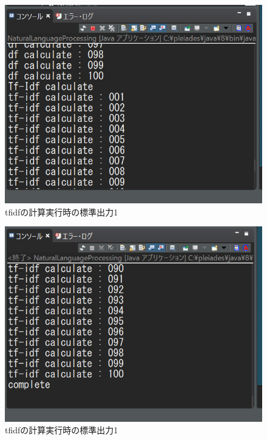 \documentclass[a4j]{jarticle}
\begin{document}
\begin{figure}[H]
	\centering
	\includegraphics[scale=0.65]{tfidfstart.png}
	\caption{tfidfの計算実行時の標準出力1}
   \label{startidf}
  \end{figure}

  \begin{figure}[H]
	\centering
	\includegraphics[scale=0.65]{tfidfend.png}
	\caption{tfidfの計算実行時の標準出力1}
   \label{endidf}
  \end{figure}
\end{document}
